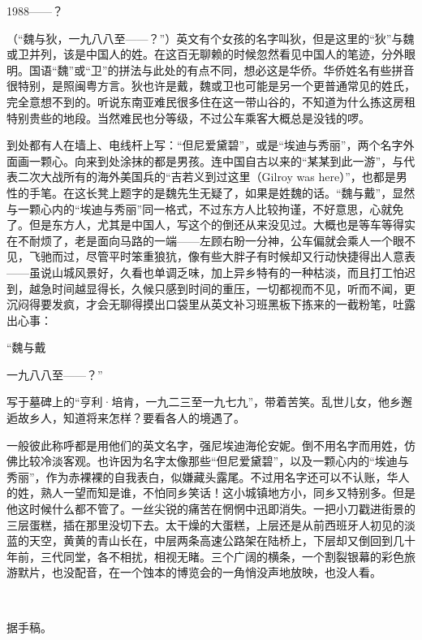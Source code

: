 \par 1988——？
\par （“魏与狄，一九八八至——？”）英文有个女孩的名字叫狄，但是这里的“狄”与魏或卫并列，该是中国人的姓。在这百无聊赖的时候忽然看见中国人的笔迹，分外眼明。国语“魏”或“卫”的拼法与此处的有点不同，想必这是华侨。华侨姓名有些拼音很特别，是照闽粤方言。狄也许是戴，魏或卫也可能是另一个更普通常见的姓氏，完全意想不到的。听说东南亚难民很多住在这一带山谷的，不知道为什么拣这房租特别贵些的地段。当然难民也分等级，不过公车乘客大概总是没钱的啰。
\par 到处都有人在墙上、电线杆上写：“但尼爱黛碧”，或是“埃迪与秀丽”，两个名字外面画一颗心。向来到处涂抹的都是男孩。连中国自古以来的“某某到此一游”，与代表二次大战所有的海外美国兵的“吉若义到过这里（Gilroy was here）”，也都是男性的手笔。在这长凳上题字的是魏先生无疑了，如果是姓魏的话。“魏与戴”，显然与一颗心内的“埃迪与秀丽”同一格式，不过东方人比较拘谨，不好意思，心就免了。但是东方人，尤其是中国人，写这个的倒还从来没见过。大概也是等车等得实在不耐烦了，老是面向马路的一端——左顾右盼一分神，公车偏就会乘人一个眼不见，飞驰而过，尽管平时笨重狼犺，像有些大胖子有时候却又行动快捷得出人意表——虽说山城风景好，久看也单调乏味，加上异乡特有的一种枯淡，而且打工怕迟到，越急时间越显得长，久候只感到时间的重压，一切都视而不见，听而不闻，更沉闷得要发疯，才会无聊得摸出口袋里从英文补习班黑板下拣来的一截粉笔，吐露出心事：
\par “魏与戴
\par 一九八八至——？”
\par 写于墓碑上的“亨利·培肯，一九二三至一九七九”，带着苦笑。乱世儿女，他乡邂逅故乡人，知道将来怎样？要看各人的境遇了。
\par 一般彼此称呼都是用他们的英文名字，强尼埃迪海伦安妮。倒不用名字而用姓，仿佛比较冷淡客观。也许因为名字太像那些“但尼爱黛碧”，以及一颗心内的“埃迪与秀丽”，作为赤裸裸的自我表白，似嫌藏头露尾。不过用名字还可以不认账，华人的姓，熟人一望而知是谁，不怕同乡笑话！这小城镇地方小，同乡又特别多。但是他这时候什么都不管了。一丝尖锐的痛苦在惘惘中迅即消失。一把小刀戳进街景的三层蛋糕，插在那里没切下去。太干燥的大蛋糕，上层还是从前西班牙人初见的淡蓝的天空，黄黄的青山长在，中层两条高速公路架在陆桥上，下层却又倒回到几十年前，三代同堂，各不相扰，相视无睹。三个广阔的横条，一个割裂银幕的彩色旅游默片，也没配音，在一个蚀本的博览会的一角悄没声地放映，也没人看。
\par  
\par *据手稿。






